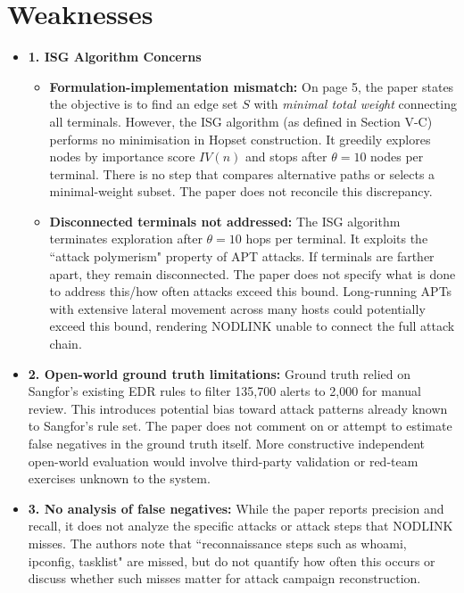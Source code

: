 \documentclass[11pt]{article}
\begin{document}
\section*{Weaknesses}
\begin{itemize}
    \item \textbf{1. ISG Algorithm Concerns} 
    \begin{itemize}
        \item \textbf{Formulation-implementation mismatch:} On page 5, the paper states the objective is to find an edge set $S$ with \textit{minimal total weight} connecting all terminals. However, the ISG algorithm (as defined in Section V-C) performs no minimisation in Hopset construction. It greedily explores nodes by importance score $IV(n)$ and stops after $\theta=10$ nodes per terminal. There is no step that compares alternative paths or selects a minimal-weight subset. The paper does not reconcile this discrepancy.
        \item \textbf{Disconnected terminals not addressed:} The ISG algorithm terminates exploration after $\theta = 10$ hops per terminal. It exploits the ``attack polymerism" property of APT attacks. If terminals are farther apart, they remain disconnected. The paper does not specify what is done to address this/how often attacks exceed this bound. Long-running APTs with extensive lateral movement across many hosts could potentially exceed this bound, rendering NODLINK unable to connect the full attack chain.
    \end{itemize}
    \item \textbf{2. Open-world ground truth limitations:} Ground truth relied on Sangfor's existing EDR rules to filter 135,700 alerts to 2,000 for manual review. This introduces potential bias toward attack patterns already known to Sangfor's rule set. The paper does not comment on or attempt to estimate false negatives in the ground truth itself. More constructive independent open-world evaluation would involve third-party validation or red-team exercises unknown to the system.
    \item \textbf{3. No analysis of false negatives:} While the paper reports precision and recall, it does not analyze the specific attacks or attack steps that NODLINK misses. The authors note that ``reconnaissance steps such as whoami, ipconfig, tasklist" are missed, but do not quantify how often this occurs or discuss whether such misses matter for attack campaign reconstruction.
\end{itemize}
\end{document}
